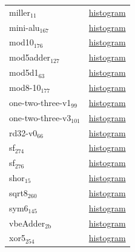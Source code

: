 \begin{center}
\begin{tabular}{ll}
miller\(_{\text{11}}\) & \href{post\_analysis/miller\_11/output\_instruction\_types.png}{histogram}\\
mini-alu\(_{\text{167}}\) & \href{post\_analysis/mini\_alu\_167/output\_instruction\_types.png}{histogram}\\
mod10\(_{\text{176}}\) & \href{post\_analysis/mod10\_176/output\_instruction\_types.png}{histogram}\\
mod5adder\(_{\text{127}}\) & \href{post\_analysis/mod5adder\_127/output\_instruction\_types.png}{histogram}\\
mod5d1\(_{\text{63}}\) & \href{post\_analysis/mod5d1\_63/output\_instruction\_types.png}{histogram}\\
mod8-10\(_{\text{177}}\) & \href{post\_analysis/mod8\_10\_177/output\_instruction\_types.png}{histogram}\\
one-two-three-v1\(_{\text{99}}\) & \href{post\_analysis/one\_two\_three\_v1\_99/output\_instruction\_types.png}{histogram}\\
one-two-three-v3\(_{\text{101}}\) & \href{post\_analysis/one\_two\_three\_v3\_101/output\_instruction\_types.png}{histogram}\\
rd32-v0\(_{\text{66}}\) & \href{post\_analysis/rd32\_v0\_66/output\_instruction\_types.png}{histogram}\\
sf\(_{\text{274}}\) & \href{post\_analysis/sf\_274/output\_instruction\_types.png}{histogram}\\
sf\(_{\text{276}}\) & \href{post\_analysis/sf\_276/output\_instruction\_types.png}{histogram}\\
shor\(_{\text{15}}\) & \href{post\_analysis/shor\_15/output\_instruction\_types.png}{histogram}\\
sqrt8\(_{\text{260}}\) & \href{post\_analysis/sqrt8\_260/output\_instruction\_types.png}{histogram}\\
sym6\(_{\text{145}}\) & \href{post\_analysis/sym6\_145/output\_instruction\_types.png}{histogram}\\
vbeAdder\(_{\text{2b}}\) & \href{post\_analysis/vbeAdder\_2b/output\_instruction\_types.png}{histogram}\\
xor5\(_{\text{254}}\) & \href{post\_analysis/xor5\_254/output\_instruction\_types.png}{histogram}\\
\end{tabular}
\end{center}


